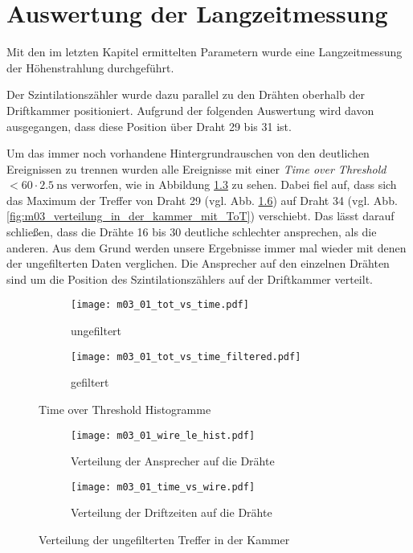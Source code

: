 \documentclass[11pt, ngerman, fleqn, DIV=15, headinclude, BCOR=2cm]{scrreprt}
\begin{document}
\clearpage


\chapter{Auswertung der Langzeitmessung}

Mit den im letzten Kapitel ermittelten Parametern wurde eine Langzeitmessung
der Höhenstrahlung durchgeführt.

Der Szintilationszähler wurde dazu parallel zu den Drähten oberhalb der
Driftkammer positioniert. Aufgrund der folgenden Auswertung wird davon
ausgegangen, dass diese Position über Draht 29 bis 31 ist.

Um das immer noch vorhandene Hintergrundrauschen von den deutlichen
Ereignissen zu trennen wurden alle Ereignisse mit einer \emph{Time over
Threshold} $ < 60 \cdot \SI{2.5}{\nano\second}$ verworfen, wie in Abbildung
\ref{fig:m03_tot_vs_time} zu sehen.
Dabei fiel auf, dass sich das Maximum der Treffer von Draht 29
(vgl. Abb. \ref{fig:m03_verteilung_in_der_kammer}) auf Draht 34 (vgl. Abb.
\ref{fig:m03_verteilung_in_der_kammer_mit_ToT}) verschiebt. Das lässt darauf
schließen, dass die Drähte 16 bis 30 deutliche schlechter ansprechen, als die
anderen. Aus dem Grund werden unsere Ergebnisse immer mal wieder mit denen der
ungefilterten Daten verglichen.
Die Ansprecher auf den einzelnen Drähten sind um die Position des
Szintilationszählers auf der Driftkammer verteilt.


\begin{figure}
	\centering
	\begin{subfigure}{0.49 \linewidth}
		\texttt{[image: m03\_01\_tot\_vs\_time.pdf]}
		\caption{%
			ungefiltert
		}
		\label{fig:m03_tot_vs_time_unfiltered}
	\end{subfigure}
	\begin{subfigure}{0.49 \linewidth}
		\texttt{[image: m03\_01\_tot\_vs\_time\_filtered.pdf]}
		\caption{%
			gefiltert
		}
		\label{fig:m03_tot_vs_time_filtered}
	\end{subfigure}
	\caption{%
		Time over Threshold Histogramme
	}
	\label{fig:m03_tot_vs_time}
\end{figure}

\begin{figure}
	\centering
	\begin{subfigure}{0.49 \linewidth}
		\texttt{[image: m03\_01\_wire\_le\_hist.pdf]}
		\caption{%
			Verteilung der Ansprecher auf die Drähte
		}
		\label{fig:m03_wire_le_hist_filtered}
	\end{subfigure}
	\begin{subfigure}{0.49 \linewidth}
		\texttt{[image: m03\_01\_time\_vs\_wire.pdf]}
		\caption{%
			Verteilung der Driftzeiten auf die Drähte
		}
		\label{fig:m03_time_vs_wire_filtered}
	\end{subfigure}
	\caption{%
		Verteilung der ungefilterten Treffer in der Kammer
	}
	\label{fig:m03_verteilung_in_der_kammer}
\end{figure}
\end{document}
